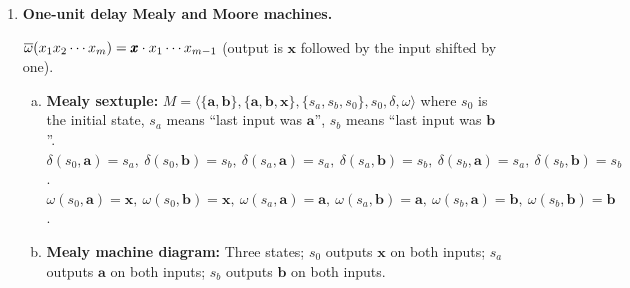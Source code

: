\begin{enumerate}[{7.}1.]
\begin{enumerate}[(a)]
  \item $\mu(s_{0_1})=\DBAR_2(s_{0_2},\lambda)=s_{0_2}$.
  \item $\mu(\delta_1(s,\pmb{a}))=\DBAR_2(s_{0_2},x\pmb{a})=\delta_2(\DBAR_2(s_{0_2},x),\pmb{a})=\delta_2(\mu(s),\pmb{a})$.
  \item $\omega_1(s,\pmb{a})=\OBAR_1(s_{0_1},x\pmb{a})|_{\text{last output}}=\OBAR_2(s_{0_2},x\pmb{a})|_{\text{last}}=\omega_2(\mu(s),\pmb{a})$.  (The output functions agree since the machines are equivalent and $\mu$ commutes with transitions.)
  \item \textbf{Injective:} If $\mu(s)=\mu(t)$, then $\DBAR_2(s_{0_2},x_s)=\DBAR_2(s_{0_2},x_t)$, so $s$ and $t$ have the same output behavior from $s_{0_1}$; by $M_1$ being reduced, $s=t$.
  \item \textbf{Surjective:} Since $M_2$ is connected, every $t\in S_2$ is reachable: $t=\DBAR_2(s_{0_2},y)$ for some $y$.  Let $s=\DBAR_1(s_{0_1},y)$; then $\mu(s)=t$.
\end{enumerate}

\item \textbf{One-unit delay Mealy and Moore machines.}

$\overline{\omega}(x_1x_2\cdots x_m)=\pmb{x}\cdot x_1\cdots x_{m-1}$ (output is $\pmb{x}$ followed by the input shifted by one).

\begin{enumerate}[(a)]
  \item \textbf{Mealy sextuple:}
  $M=\langle\{\pmb{a},\pmb{b}\},\{\pmb{a},\pmb{b},\pmb{x}\},\{s_a,s_b,s_0\},s_0,\delta,\omega\rangle$ where $s_0$ is the initial state, $s_a$ means ``last input was $\pmb{a}$'', $s_b$ means ``last input was $\pmb{b}$''.
  $\delta(s_0,\pmb{a})=s_a,\ \delta(s_0,\pmb{b})=s_b,\ \delta(s_a,\pmb{a})=s_a,\ \delta(s_a,\pmb{b})=s_b,\ \delta(s_b,\pmb{a})=s_a,\ \delta(s_b,\pmb{b})=s_b$.
  $\omega(s_0,\pmb{a})=\pmb{x},\ \omega(s_0,\pmb{b})=\pmb{x},\ \omega(s_a,\pmb{a})=\pmb{a},\ \omega(s_a,\pmb{b})=\pmb{a},\ \omega(s_b,\pmb{a})=\pmb{b},\ \omega(s_b,\pmb{b})=\pmb{b}$.

  \item \textbf{Mealy machine diagram:} Three states; $s_0$ outputs $\pmb{x}$ on both inputs; $s_a$ outputs $\pmb{a}$ on both inputs; $s_b$ outputs $\pmb{b}$ on both inputs.


\end{enumerate}
\end{enumerate}
